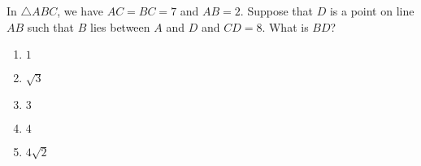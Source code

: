 In $\triangle ABC$, we have $AC=BC=7$ and $AB=2$. Suppose that $D$ is a point on line $AB$ such that $B$ lies between $A$ and $D$ and $CD=8$. What is $BD$?
\begin{enumerate}
\item $1$
\item $\sqrt{3}$
\item $3$
\item $4$
\item $4\sqrt{2}$
\end{enumerate}
